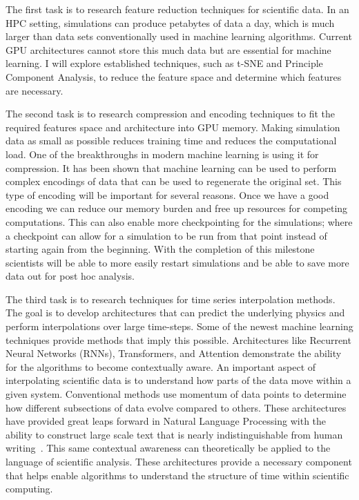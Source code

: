 \documentclass[12pt]{article}
\begin{document}
\noindent The first task is to research feature reduction techniques for
scientific data. In an HPC setting, simulations can produce petabytes of data a
day, which is much larger than data sets conventionally used in machine learning
algorithms. Current GPU architectures cannot store this much data but are
essential for machine learning. I will explore established techniques, such as
t-SNE and Principle Component Analysis, to reduce the feature space and
determine which features are necessary.

\noindent The second task is to research compression and encoding techniques to
fit the required features space and architecture into GPU memory. Making
simulation data as small as possible reduces training time and reduces the
computational load. One of the breakthroughs in modern machine learning is using
it for compression. It has been shown that machine learning can be used to
perform complex encodings of data that can be used to regenerate the original
set. This type of encoding will be important for several reasons. Once we have a
good encoding we can reduce our memory burden and free up resources for
competing computations. This can also enable more checkpointing for the
simulations; where a checkpoint can allow for a simulation to be run from that
point instead of starting again from the beginning. With the completion of this
milestone scientists will be able to more easily restart simulations and be able
to save more data out for post hoc analysis.

\noindent The third task is to research techniques for time series interpolation
methods. The goal is to develop architectures that can predict 
the underlying physics and perform interpolations over large time-steps. Some
of the newest machine learning techniques provide methods that imply this
possible. Architectures like Recurrent Neural Networks (RNNs), Transformers, and
Attention demonstrate the ability for the algorithms to become contextually
aware. An important aspect of interpolating scientific data is to understand how
parts of the data move within a given system. Conventional methods use momentum
of data points to determine how different subsections of data evolve compared to
others. These architectures have provided great leaps forward in Natural
Language Processing with the ability to construct large scale text that is
nearly indistinguishable from human writing~\cite{radford2019language}. This
same contextual awareness can theoretically be applied to the language of
scientific analysis. These architectures provide a necessary component that
helps enable algorithms to understand the structure of time within scientific
computing. 
\end{document}
